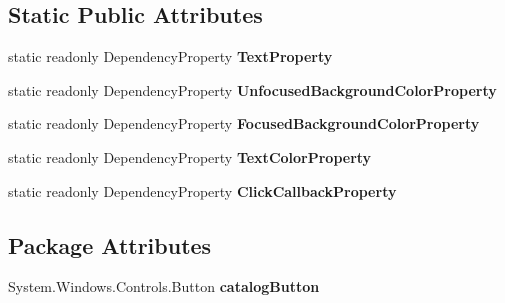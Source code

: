 \subsection*{Static Public Attributes}
\begin{DoxyCompactItemize}
\item 
static readonly Dependency\+Property {\bfseries Text\+Property}
\item 
static readonly Dependency\+Property {\bfseries Unfocused\+Background\+Color\+Property}
\item 
static readonly Dependency\+Property {\bfseries Focused\+Background\+Color\+Property}
\item 
static readonly Dependency\+Property {\bfseries Text\+Color\+Property}
\item 
static readonly Dependency\+Property {\bfseries Click\+Callback\+Property}
\end{DoxyCompactItemize}
\subsection*{Package Attributes}
\begin{DoxyCompactItemize}
\item 
\mbox{\label{class_teacher_handbook_1_1_controls_1_1_catalog_button_ae45079c15cbf261f88829dba291174b0}} 
System.\+Windows.\+Controls.\+Button {\bfseries catalog\+Button}
\end{DoxyCompactItemize}
